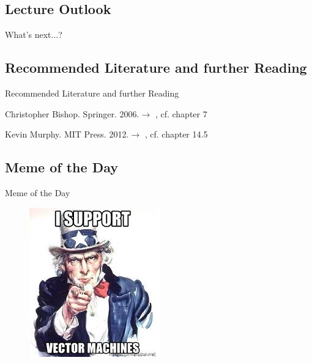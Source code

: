 \subsection{Lecture Outlook}

\begin{frame}{What's next...?}{}
\end{frame}


\subsection{Recommended Literature and further Reading}

\begin{frame}[allowframebreaks]{Recommended Literature and further Reading}{}
	\footnotesize
	\begin{thebibliography}{2}
			{Christopher Bishop. Springer. 2006.}{$\rightarrow$ \href{
				http://users.isr.ist.utl.pt/~wurmd/Livros/school/Bishop\%20-\%20Pattern\%20Recognition\%20And\%20Machine\%20Learning\%20-\%20Springer\%20\%202006.pdf
			}{}, cf. chapter 7}
			
			{Kevin Murphy. MIT Press. 2012.}{$\rightarrow$ \href{
				https://doc.lagout.org/science/Artificial\%20Intelligence/Machine\%20learning/Machine\%20Learning_\%20A\%20Probabilistic\%20Perspective\%20\%5BMurphy\%202012-08-24\%5D.pdf
			}{}, cf. chapter 14.5}
	\end{thebibliography}
\end{frame}


\subsection{Meme of the Day}

\begin{frame}{Meme of the Day}{}
	\begin{figure}
		\includegraphics[scale=0.8]{11_svm/02_img/meme_of_the_day}
	\end{figure}
\end{frame}


\makethanks

